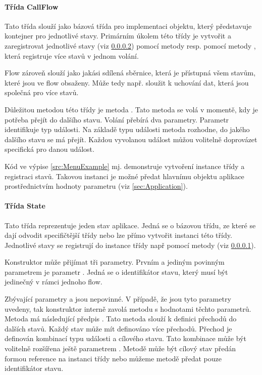\documentclass[ing,male,java,dept460]{diploma}						%
\begin{document}
\paragraph{Třída CallFlow}
\label{sec:CallFlow}
Tato třída slouží jako bázová třída pro implementaci objektu, který představuje kontejner pro jednotlivé stavy. Primárním úkolem této třídy je vytvořit a zaregistrovat jednotlivé stavy (viz \ref{sec:State}) pomocí metody  resp. pomocí metody , která registruje více stavů v jednom volání.

Flow zároveň slouží jako jakási sdílená sběrnice, která je přístupná všem stavům, které jsou ve flow obsaženy. Může tedy např. sloužit k uchování dat, která jsou společná pro více stavů.

Důležitou metodou této třídy je metoda . Tato metoda se volá v momentě, kdy je potřeba přejít do dalšího stavu. Volání přebírá dva parametry. Parametr  identifikuje typ události. Na základě typu události metoda rozhodne, do jakého dalšího stavu se má přejít. Každou vyvolanou událost můžou volitelně doprovázet  specifická pro danou událost.

Kód ve výpise \ref{src:MenuExample} mj. demonstruje vytvoření instance třídy  a registraci stavů. Takovou instanci je možné předat hlavnímu objektu aplikace prostřednictvím hodnoty parametru  (viz \ref{sec:Application}).

\paragraph{Třída State}
\label{sec:State}
Tato třída reprezentuje jeden stav aplikace. Jedná se o bázovou třídu, ze které se dají odvodit specifičtější třídy nebo lze přímo vytvořit instanci této třídy. Jednotlivé stavy se registrují do instance třídy  např pomocí metody  (viz \ref{sec:CallFlow}).

Konstruktor může přijímat tři parametry. Prvním a jediným povinným parametrem je parametr . Jedná se o identifikátor stavu, který musí být jedinečný v rámci jednoho flow.

Zbývající parametry  a  jsou nepovinné. V případě, že jsou tyto parametry uvedeny, tak konstruktor interně zavolá metodu  s hodnotami těchto parametrů. Metoda má následující předpis . Tato metoda slouží k definici přechodů do dalších stavů. Každý stav může mít definováno více přechodů. Přechod je definován kombinací typu události a cílového stavu. Tato kombinace může být volitelně rozšířena ještě parametrem . Metodě  může být cílový stav  předán formou reference na instanci třídy  nebo můžeme metodě předat pouze identifikátor stavu.
\end{document}
